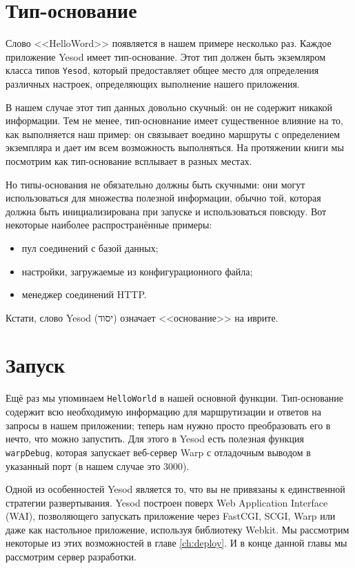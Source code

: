 \section{Тип-основание}

Слово <<HelloWord>> появляется в нашем примере несколько раз. Каждое приложение Yesod
имеет тип-основание. Этот тип должен быть экземляром класса типов \lstinline!Yesod!,
который предоставляет общее место для определения различных настроек, определяющих
выполнение нашего приложения.

В нашем случае этот тип данных довольно скучный: он не содержит никакой
информации. Тем не менее, тип-основнание имеет существенное влияние на то, как выполняется
наш пример: он связывает воедино маршруты с определением экземпляра и дает им всем
возможность выполняться. На протяжении книги мы посмотрим как тип-основание всплывает в
разных местах.

Но типы-основания не обязательно должны быть скучными: они могут использоваться для
множества полезной информации, обычно той, которая должна быть инициализирована при
запуске и использоваться повсюду. Вот некоторые наиболее распространённые примеры:

\begin{itemize}
  \item пул соединений с базой данных;
  \item настройки, загружаемые из конфигурационного файла;
  \item менеджер соединений HTTP.
\end{itemize}

\begin{remark}
  Кстати, слово Yesod (יסוד) означает <<основание>> на иврите.
\end{remark}

\section{Запуск}

Ещё раз мы упоминаем \lstinline!HelloWorld! в нашей основной функции. Тип-основание
содержит всю необходимую информацию для маршрутизации и ответов на запросы в нашем
приложении; теперь нам нужно просто преобразовать его в нечто, что можно запустить. Для
этого в Yesod есть полезная функция \lstinline!warpDebug!, которая запускает веб-сервер
Warp с отладочным выводом в указанный порт (в нашем случае это $3000$).

Одной из особенностей Yesod является то, что вы не привязаны к единственной стратегии
развертывания. Yesod построен поверх Web Application Interface (WAI), позволяющего
запускать приложение через FastCGI, SCGI, Warp или даже как настольное приложение,
используя библиотеку Webkit. Мы рассмотрим некоторые из этих возможностей в главе
\ref{ch:deploy}. И в конце данной главы мы рассмотрим сервер разработки.


